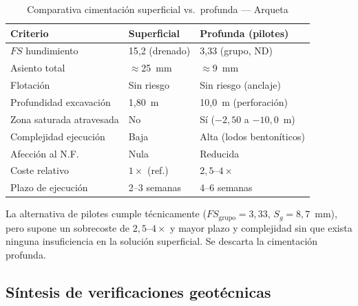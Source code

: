 \begin{table}[H]
  \centering
  \caption{Comparativa cimentación superficial vs.\ profunda --- Arqueta}
  \label{tab:comp_cimentacion_arqueta}
  \begin{tabular}{@{}lll@{}}
    \toprule
    \textbf{Criterio} & \textbf{Superficial} & \textbf{Profunda (pilotes)}\\
    \midrule
    $FS$ hundimiento          & 15,2 (drenado)     & 3,33 (grupo, ND)\\
    Asiento total             & $\approx$25~mm      & $\approx$9~mm\\
    Flotación                 & Sin riesgo          & Sin riesgo (anclaje)\\
    Profundidad excavación    & 1,80~m              & 10,0~m (perforación)\\
    Zona saturada atravesada  & No                  & Sí ($-2{,}50$ a $-10{,}0$~m)\\
    Complejidad ejecución     & Baja                & Alta (lodos bentoníticos)\\
    Afección al N.F.           & Nula                & Reducida\\
    Coste relativo            & $1\times$ (ref.)    & $2{,}5$–$4\times$\\
    Plazo de ejecución        & 2–3 semanas         & 4–6 semanas\\
    \bottomrule
  \end{tabular}
\end{table}

\begin{notabox}
  La alternativa de pilotes cumple técnicamente ($FS_\text{grupo}=3{,}33$,
  $S_g=8{,}7$~mm), pero supone un sobrecoste de $2{,}5$–$4\times$ y mayor
  plazo y complejidad sin que exista ninguna insuficiencia en la solución
  superficial. Se descarta la cimentación profunda.
\end{notabox}

\subsection{Síntesis de verificaciones geotécnicas}
\label{subsec:sintesis_geotecnia_arqueta}

